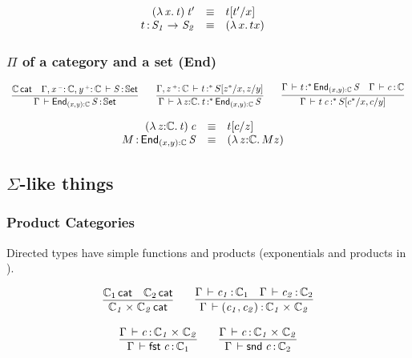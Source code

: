 \documentclass[11pt]{article}
\theoremstyle{plain}
\begin{document}
\[
\begin{array}{rcll}
\mathit{({\lambda\,x.\,t}) \: t'} & \equiv & t [ t' / x ] \\
t \, \mathit{:} \, \mathit{S_1}\rightarrow_{\mathit{}} \mathit{S_2} & \equiv & {({\lambda\,x.\,t}{x})} &
\end{array} \\
\]

\subsubsection{$\Pi$ of a category and a set (End)}

\[
\begin{array}{c}
\infer{\ofdtp{\Gamma}{\picat{(x,y)}{\C}{S}}{\types}}
      {\wfdtp{\C} &
        \ofdtp{\Gamma,\catvar{x}{\con}{\C},\catvar{y}{\co}{\C}}{S}{\types}}
\qquad
\infer{\oftpe{\Gamma}{\lam{z}{\C}{t}}{\vcond}{\picat {(x,y)} \C S}}
      {\oftpe{\Gamma,\catvar{z}{\co}{\C}}{t}{\vcond}{\tsubst{S}{z^*/x,z/y}}}
\qquad
\infer{\oftpe{\Gamma}{\app t {c}}{\vcond}{\tsubst S {c^*/x,c/y}}}
      {\oftpe{\Gamma}{t}{\vcond}{\picat{(x,y)}{\C}{S}} &
        \ofdtp{\Gamma}{c}{\C}}
\end{array}
\]

\[
\begin{array}{rcll}
\mathit{({\lambda\,z \mathit{:} \mathbb{C}.\,t}) \: c} & \equiv & t [ c / z ] \\
M \, \mathit{:} \, \textnormal{\ensuremath{\mathsf{End}}}_{(x,y) \mathit{:} \mathbb{C}} \,\mathit{S} & \equiv & {({\lambda\,z \mathit{:} \mathbb{C}.\,M}{z})} &
\end{array} \\
\]

\subsection{$\Sigma$-like things}

\subsubsection{Product Categories}

Directed types have simple functions and products (exponentials and
products in \Cat).


\[
\begin{array}{c}
\infer{\wfdtp{\prd{\C_1}{\C_2}}}
      {\wfdtp{\C_1} &
        \wfdtp{\C_2}}
\qquad
\infer{\ofdtp{\Gamma}{\pair{c_1}{c_2}}{\prd {\C_1} {\C_2}}}
      {\ofdtp{\Gamma}{c_1}{\C_1} &
       \ofdtp{\Gamma}{c_2}{\C_2}}
\\ \\
\infer{\ofdtp{\Gamma}{\fst c}{\C_1}}
      {\ofdtp{\Gamma}{c}{\prd{\C_1}{\C_2}}}
\qquad
\infer{\ofdtp{\Gamma}{\snd c}{\C_2}}
      {\ofdtp{\Gamma}{c}{\prd{\C_1}{\C_2}}}
\end{array}
\]
\end{document}
